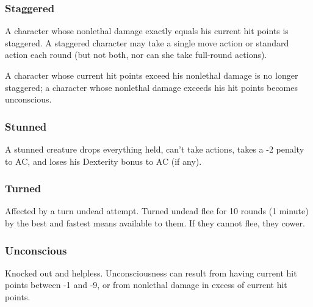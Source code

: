 \subsubsection{Staggered}

A character whose nonlethal damage exactly equals his current 
hit points is staggered. A staggered character may take a single move action or 
standard action each round (but not both, nor can she take full-round actions).

A character whose current hit points exceed his nonlethal damage is no longer staggered; 
a character whose nonlethal damage exceeds his hit points becomes unconscious.

\subsubsection{Stunned}

A stunned creature drops everything held, can't take actions, 
takes a -2 penalty to AC, and loses his Dexterity bonus to AC (if any).

\subsubsection{Turned}

Affected by a turn undead attempt. Turned undead flee for 10 rounds 
(1 minute) by the best and fastest means available to them. If they cannot flee, 
they cower.

\subsubsection{Unconscious}

Knocked out and helpless. Unconsciousness can result from 
having current hit points between -1 and -9, or from nonlethal damage in excess 
of current hit points.

